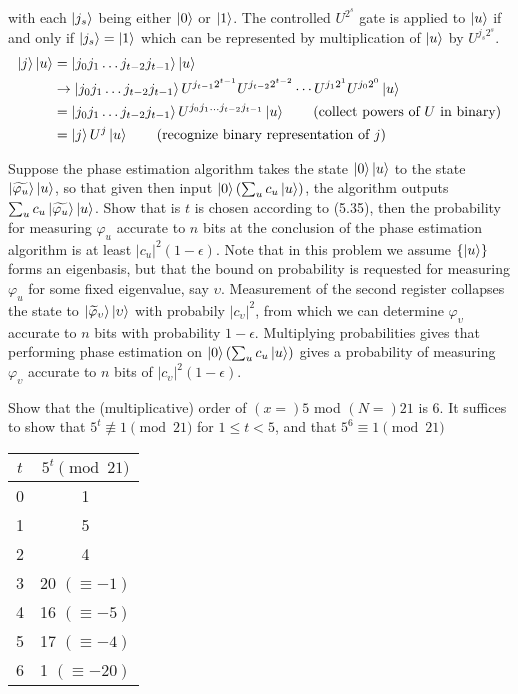 with each $\ket{j_s}$ being either $\ket{0}$ or $\ket{1}$.  The controlled $U^{2^s}$ gate is applied to $\ket{u}$ if and only if $\ket{j_s} = \ket{1}$ which can be represented by multiplication of $\ket{u}$ by $U^{j_s2^s}$.
\begin{align*}
\ket{j}\ket{u} &= \ket{j_0j_1\ldots j_{t-2}j_{t-1}}\ket{u} \\
&\rightarrow \ket{j_0j_1\ldots j_{t-2}j_{t-1}}  U^{j_{t-1}2^{t-1}}U^{j_{t-2}2^{t-2}}\cdots U^{j_12^1}U^{j_02^0}\ket{u}\\
&= \ket{j_0j_1\ldots j_{t-2}j_{t-1}} U^{j_0j_1\ldots j_{t-2}j_{t-1}}\ket{u}  \tag{collect powers of $U$ in binary}\\
&= \ket{j}U^j\ket{u} \tag{recognize binary representation of $j$}
\end{align*}

 Suppose the phase estimation algorithm takes the state $\ket{0}\ket{u}$ to the state $\ket{\widetilde{\varphi_u}}\ket{u}$, so that given then input $\ket{0}(\sum_uc_u\ket{u})$, the algorithm outputs $\sum_uc_u\ket{\widetilde{\varphi_u}}\ket{u}$.  Show that is $t$ is chosen according to (5.35), then the probability for measuring $\varphi_u$ accurate to $n$ bits at the conclusion of the phase estimation algorithm is at least $|c_u|^2(1-\epsilon)$.
\Soln Note that in this problem we assume $\{\ket{u}\}$ forms an eigenbasis, but that the bound on probability is requested for measuring $\varphi_u$ for some fixed eigenvalue, say $\upsilon$.  Measurement of the second register collapses the state  to $\ket{\widetilde\varphi_{\upsilon}}\ket{\upsilon}$ with probabily $|c_{\upsilon}|^2$, from which we can determine $\varphi_{\upsilon}$ accurate to $n$ bits with probability $1-\epsilon$.  Multiplying probabilities gives that performing phase estimation on $\ket{0}(\sum_uc_u\ket{u})$ gives a probability of measuring $\varphi_{\upsilon}$ accurate to $n$ bits of $|c_\upsilon|^2(1-\epsilon)$. 

 Show that the (multiplicative) order of $(x=)5$ mod $(N=)21$ is $6$.
\Soln It suffices to show that $5^t \not\equiv 1 \pmod{21}$ for $1\leq t < 5$, and that $5^6 \equiv 1 \pmod{21}$
\begin{center}
\begin{tabular}{|c|c|}
\hline
$t$ & $5^t \pmod{21}$ \\
\hline
\hline
0 & 1 \\
\hline
1 & 5 \\
\hline
2 & 4 \\
\hline
3 & 20 $(\equiv -1)$ \\
\hline
4 & 16 $(\equiv -5)$ \\
\hline
5 & 17 $(\equiv -4)$ \\
\hline
\hline
6 & 1 $(\equiv -20)$ \\
\hline
\end{tabular}
\end{center}

